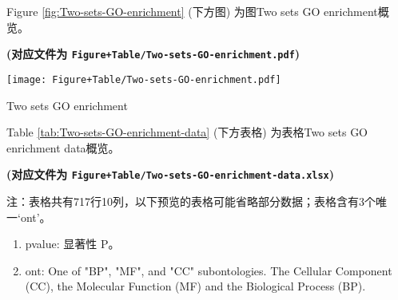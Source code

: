 \documentclass[
]{article}
\providecommand{\tightlist}{%
  \setlength{\itemsep}{0pt}\setlength{\parskip}{0pt}}
\begin{document}
Figure \ref{fig:Two-sets-GO-enrichment} (下方图) 为图Two sets GO enrichment概览。

\textbf{(对应文件为 \texttt{Figure+Table/Two-sets-GO-enrichment.pdf})}

\def\@captype{figure}
\begin{center}
\texttt{[image: Figure+Table/Two-sets-GO-enrichment.pdf]}
\caption{Two sets GO enrichment}\label{fig:Two-sets-GO-enrichment}
\end{center}

Table \ref{tab:Two-sets-GO-enrichment-data} (下方表格) 为表格Two sets GO enrichment data概览。

\textbf{(对应文件为 \texttt{Figure+Table/Two-sets-GO-enrichment-data.xlsx})}

\begin{center}\begin{tcolorbox}[colback=gray!10, colframe=gray!50, width=0.9\linewidth, arc=1mm, boxrule=0.5pt]注：表格共有717行10列，以下预览的表格可能省略部分数据；表格含有3个唯一`ont'。
\end{tcolorbox}
\end{center}
\begin{center}\begin{tcolorbox}[colback=gray!10, colframe=gray!50, width=0.9\linewidth, arc=1mm, boxrule=0.5pt]\begin{enumerate}\tightlist
\item pvalue: 显著性 P。
\item ont: One of "BP", "MF", and "CC" subontologies. The Cellular Component (CC), the Molecular Function (MF) and the Biological Process (BP).
\end{enumerate}\end{tcolorbox}
\end{center}
\end{document}
